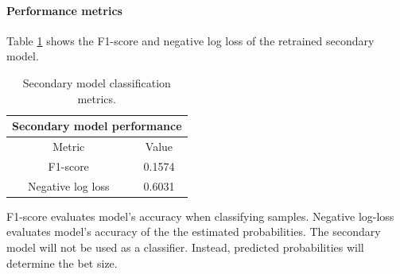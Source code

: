 \paragraph{Performance metrics} Table \ref{table:perf_secondary_model}
shows the F1-score and negative log loss of the retrained secondary model.

\begin{table}[H]
  \centering
  \begin{tabular}{|c | c |} 
    \hline
    \multicolumn{2}{|c|}{Secondary model performance} \\
    \hline
    Metric & Value \\
    \hline
    F1-score                & 0.1574 \\
    \hline
    Negative log loss       & 0.6031 \\
    \hline
  \end{tabular}
  \caption{Secondary model classification metrics.}
  \label{table:perf_secondary_model}
\end{table}

F1-score evaluates model's accuracy when classifying samples. Negative log-loss
evaluates model's accuracy of the the estimated probabilities. The secondary
model will not be used as a classifier. Instead, predicted probabilities will
determine the bet size.